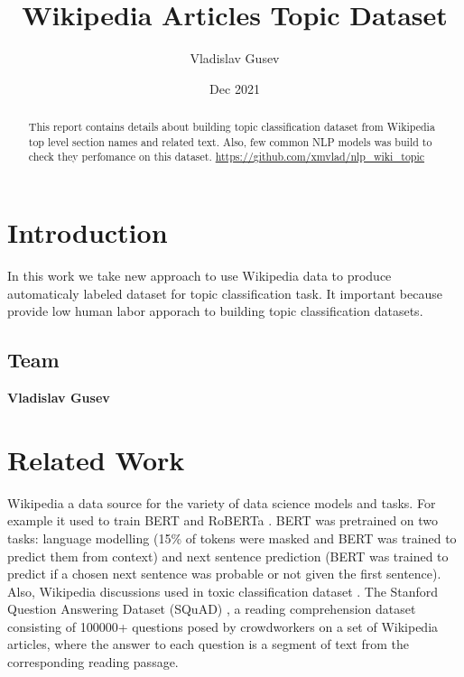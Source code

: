 \documentclass{article}
\title{Wikipedia Articles Topic Dataset}
\author{Vladislav Gusev}
\date{Dec 2021}
\begin{document}
\maketitle
\begin{abstract}
    This report contains details about building topic classification dataset from Wikipedia top level section names and related text. Also, few common NLP models was build to check they perfomance on this dataset.
    \url{https://github.com/xmvlad/nlp_wiki_topic}
\end{abstract}


\section{Introduction}
In this work we take new approach to use Wikipedia data to produce automaticaly labeled dataset for topic classification task. It important because provide low human labor apporach to building topic classification datasets. 

\subsection{Team}
\textbf{Vladislav Gusev}

\section{Related Work}
\label{sec:related}
Wikipedia a data source for the variety of data science models and tasks. For example it used to train BERT \cite{Devlin2018} and RoBERTa \cite{yinhan2019roberta}. 
BERT was pretrained on two tasks: language modelling (15\% of tokens were masked and BERT was trained to predict them from context) and next sentence prediction (BERT was trained to predict if a chosen next sentence was probable or not given the first sentence).
Also, Wikipedia discussions used in toxic classification dataset \cite{thain2017wikipedia}.
The Stanford Question Answering Dataset (SQuAD) \cite{rajpurkar2016squad}, a reading comprehension dataset consisting of 100000+ questions posed by crowdworkers on a set of Wikipedia articles, where the answer to each question is a segment of text from the corresponding reading passage.
\end{document}
